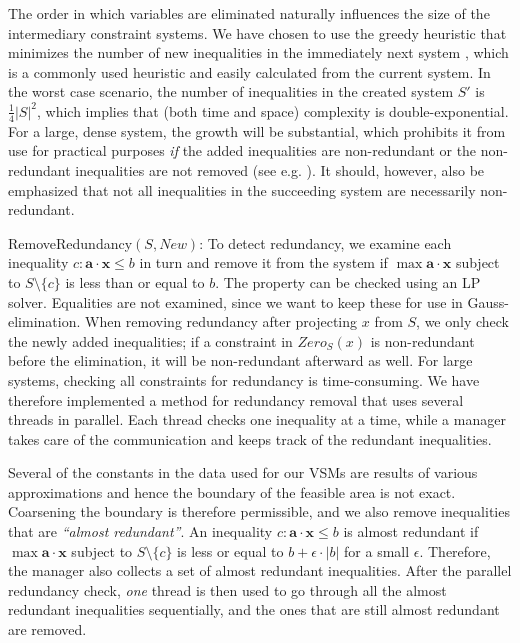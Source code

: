 \documentclass{llncs}
\newcommand{\Pos}{\mathit{Pos}}
\newcommand{\Neg}{\mathit{Neg}}
\newcommand{\mi}{\mathit}
\newcommand{\ve}{\mathbf}
\begin{document}
The order in which variables are eliminated naturally influences the size of the intermediary constraint systems. We have chosen to use the greedy heuristic {that minimizes the number of new inequalities in the immediately next system \cite{duffin74}}, which is a commonly used heuristic and easily calculated from the current system. %
In the worst case scenario, %
the number of inequalities in the created system $S'$ is $\frac{1}{4}|S|^2$, which implies that (both time and space) complexity is double-exponential. For a large, dense system, the growth will be substantial, which prohibits it from use for practical purposes \emph{if} the added inequalities are non-redundant or the non-redundant inequalities are not removed ({see e.g. \cite{lukatskii08}}). It should, however, also be emphasized that not all inequalities in the succeeding system are necessarily non-redundant. %

{{\sc RemoveRedundancy}$(S,\mathit{New})$:} To detect redundancy, we examine each inequality $c: \ve{a}\cdot \ve{x}\leq b$ in turn and remove it from the system if $\max \ve{a}\cdot \ve{x}$ subject to $S\setminus\{c\}$ is less than or equal to $b$. The property can be checked using an LP solver. Equalities are not examined, since we want to keep these for use in Gauss-elimination. When removing redundancy after projecting $x$ from $S$, we only check the newly added inequalities; if a constraint in $\mi{Zero}_S(x)$ is non-redundant before the elimination, it will be non-redundant afterward as well. 
%
For large systems, checking all constraints for redundancy is time-consuming. We have therefore implemented a method for redundancy removal that uses several threads in parallel. Each thread checks one inequality at a time, while a manager takes care of the communication and keeps track of the redundant inequalities. 

Several of the constants in the data used for our VSMs are results of various approximations and hence the boundary of the feasible area is not exact. Coarsening the boundary is therefore permissible, and we also remove inequalities that are \emph{``almost redundant''}. An inequality $c: \ve{a}\cdot\ve{x}\leq b$ is almost redundant if $\max \ve{a}\cdot\ve{x}$ subject to $S\setminus\{c\}$ is less or equal to $b + \epsilon\cdot |b|$ for a small $\epsilon$. 
Therefore, the manager also collects a set of almost redundant inequalities. After the parallel redundancy check, \emph{one} thread is then used to go through all the almost redundant inequalities sequentially, and the ones that are still almost redundant are removed. 
\end{document}
